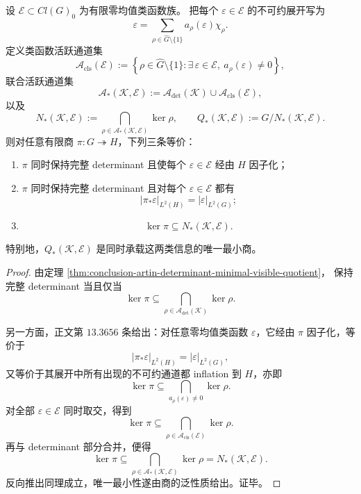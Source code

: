 \begin{theorem}\label{thm:conclusion-artin-determinant-classfunction-joint-minimal-quotient}
设 \(\mathcal E\subset Cl(G)_0\) 为有限零均值类函数族。
把每个 \(\varepsilon\in\mathcal E\) 的不可约展开写为
\[
\varepsilon
=
\sum_{\rho\in\widehat G\setminus\{1\}}a_\rho(\varepsilon)\chi_\rho.
\]
定义类函数活跃通道集
\[
\mathcal A_{\mathrm{cls}}(\mathcal E)
:=
\left\{
\rho\in\widehat G\setminus\{1\}:
\exists\,\varepsilon\in\mathcal E,\ a_\rho(\varepsilon)\neq 0
\right\},
\]
联合活跃通道集
\[
\mathcal A_\ast(\mathcal K,\mathcal E)
:=
\mathcal A_{\det}(\mathcal K)\cup \mathcal A_{\mathrm{cls}}(\mathcal E),
\]
以及
\[
N_\ast(\mathcal K,\mathcal E)
:=
\bigcap_{\rho\in\mathcal A_\ast(\mathcal K,\mathcal E)}\ker\rho,
\qquad
Q_\ast(\mathcal K,\mathcal E):=G/N_\ast(\mathcal K,\mathcal E).
\]
则对任意有限商 \(\pi:G\twoheadrightarrow H\)，下列三条等价：
\begin{enumerate}
  \item \(\pi\) 同时保持完整 determinant 且使每个 \(\varepsilon\in\mathcal E\) 经由 \(H\) 因子化；
  \item \(\pi\) 同时保持完整 determinant 且对每个 \(\varepsilon\in\mathcal E\) 都有
  \[
  |\pi_\ast\varepsilon|_{L^2(H)}=|\varepsilon|_{L^2(G)};
  \]
  \item
  \[
  \ker\pi\subseteq N_\ast(\mathcal K,\mathcal E).
  \]
\end{enumerate}
特别地，\(Q_\ast(\mathcal K,\mathcal E)\) 是同时承载这两类信息的唯一最小商。
\end{theorem}

\begin{proof}
由定理 \ref{thm:conclusion-artin-determinant-minimal-visible-quotient}，
保持完整 determinant 当且仅当
\[
\ker\pi\subseteq
\bigcap_{\rho\in\mathcal A_{\det}(\mathcal K)}\ker\rho.
\]

另一方面，正文第 \(13.3656\) 条给出：对任意零均值类函数 \(\varepsilon\)，它经由 \(\pi\) 因子化，等价于
\[
|\pi_\ast\varepsilon|_{L^2(H)}=|\varepsilon|_{L^2(G)},
\]
又等价于其展开中所有出现的不可约通道都 inflation 到 \(H\)，亦即
\[
\ker\pi
\subseteq
\bigcap_{a_\rho(\varepsilon)\neq 0}\ker\rho.
\]
对全部 \(\varepsilon\in\mathcal E\) 同时取交，得到
\[
\ker\pi
\subseteq
\bigcap_{\rho\in\mathcal A_{\mathrm{cls}}(\mathcal E)}\ker\rho.
\]
再与 determinant 部分合并，便得
\[
\ker\pi
\subseteq
\bigcap_{\rho\in\mathcal A_\ast(\mathcal K,\mathcal E)}\ker\rho
=
N_\ast(\mathcal K,\mathcal E).
\]
反向推出同理成立，唯一最小性遂由商的泛性质给出。证毕。
\end{proof}


